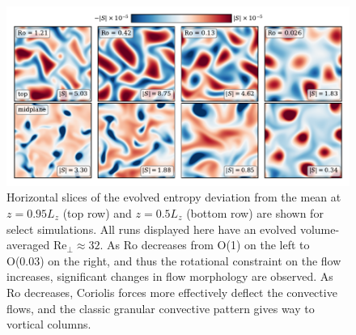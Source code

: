 \documentclass[twocolumn, amsmath, amsfonts, amssymb, trackchanges]{aastex62}
\begin{document}
\begin{figure}[t]
    \includegraphics[width=\textwidth]{dynamics_plot.pdf}
    \caption{ Horizontal slices of the evolved entropy deviation from the mean
	at $z = 0.95L_z$ (top row) and $z = 0.5L_z$ (bottom row) are shown for select simulations. 
	All runs displayed here have an evolved volume-averaged $\text{Re}_\perp \approx 32$. 
    As Ro decreases from O(1) on the left to O(0.03) on the right, and thus the rotational
    constraint on the flow increases, significant changes in flow morphology are observed.
    As Ro decreases, Coriolis forces more effectively
    deflect the convective flows, and the classic granular convective pattern gives way
    to vortical columns.
    \label{fig:dynamics_plot} }
\end{figure}
\end{document}

